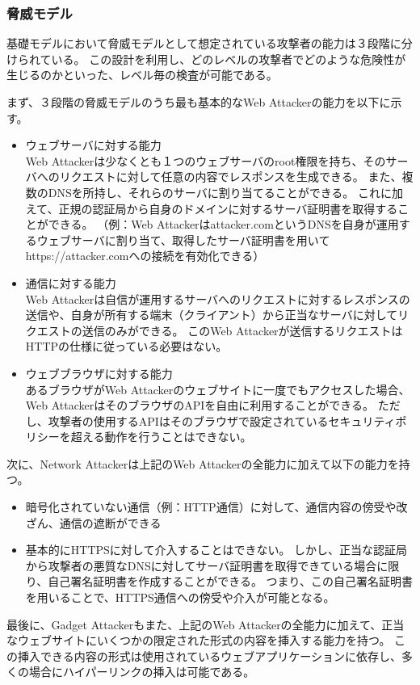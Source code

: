 \documentclass[12pt,a4paper]{jbook}
\begin{document}
\subsubsection{脅威モデル}
基礎モデルにおいて脅威モデルとして想定されている攻撃者の能力は３段階に分けられている。
この設計を利用し、どのレベルの攻撃者でどのような危険性が生じるのかといった、レベル毎の検査が可能である。

まず、３段階の脅威モデルのうち最も基本的なWeb Attackerの能力を以下に示す。
\begin{itemize}
\item ウェブサーバに対する能力 \\
Web Attackerは少なくとも１つのウェブサーバのroot権限を持ち、そのサーバへのリクエストに対して任意の内容でレスポンスを生成できる。
また、複数のDNSを所持し、それらのサーバに割り当てることができる。
これに加えて、正規の認証局から自身のドメインに対するサーバ証明書を取得することができる。
（例：Web Attackerはattacker.comというDNSを自身が運用するウェブサーバに割り当て、取得したサーバ証明書を用いてhttps://attacker.comへの接続を有効化できる）
\item 通信に対する能力 \\
Web Attackerは自信が運用するサーバへのリクエストに対するレスポンスの送信や、自身が所有する端末（クライアント）から正当なサーバに対してリクエストの送信のみができる。
このWeb Attackerが送信するリクエストはHTTPの仕様に従っている必要はない。
\item ウェブブラウザに対する能力 \\
あるブラウザがWeb Attackerのウェブサイトに一度でもアクセスした場合、Web AttackerはそのブラウザのAPIを自由に利用することができる。
ただし、攻撃者の使用するAPIはそのブラウザで設定されているセキュリティポリシーを超える動作を行うことはできない。
\end{itemize}

次に、Network Attackerは上記のWeb Attackerの全能力に加えて以下の能力を持つ。
\begin{itemize}
\item 暗号化されていない通信（例：HTTP通信）に対して、通信内容の傍受や改ざん、通信の遮断ができる
\item 基本的にHTTPSに対して介入することはできない。
しかし、正当な認証局から攻撃者の悪質なDNSに対してサーバ証明書を取得できている場合に限り、自己署名証明書を作成することができる。
つまり、この自己署名証明書を用いることで、HTTPS通信への傍受や介入が可能となる。
\end{itemize}

最後に、Gadget Attackerもまた、上記のWeb Attackerの全能力に加えて、正当なウェブサイトにいくつかの限定された形式の内容を挿入する能力を持つ。
この挿入できる内容の形式は使用されているウェブアプリケーションに依存し、多くの場合にハイパーリンクの挿入は可能である。
\end{document}
